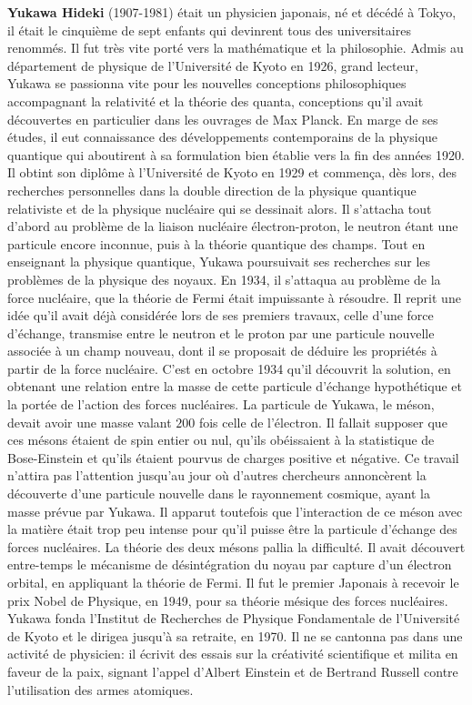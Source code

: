 \textbf{Yukawa Hideki} (1907-1981) était un physicien japonais, né et décédé à Tokyo, il était le cinquième de sept enfants qui devinrent tous des universitaires renommés. Il fut très vite porté vers la mathématique et la philosophie. Admis au département de physique de l'Université de Kyoto en 1926, grand lecteur, Yukawa se passionna vite pour les nouvelles conceptions philosophiques accompagnant la relativité et la théorie des quanta, conceptions qu'il avait découvertes en particulier dans les ouvrages de Max Planck. En marge de ses études, il eut connaissance des développements contemporains de la physique quantique qui aboutirent à sa formulation bien établie vers la fin des années 1920. Il obtint son diplôme à l'Université de Kyoto en 1929 et commença, dès lors, des recherches personnelles dans la double direction de la physique quantique relativiste et de la physique nucléaire qui se dessinait alors. Il s'attacha tout d'abord au problème de la liaison nucléaire électron-proton, le neutron étant une particule encore inconnue, puis à la théorie quantique des champs. Tout en enseignant la physique quantique, Yukawa poursuivait ses recherches sur les problèmes de la physique des noyaux. En 1934, il s'attaqua au problème de la force nucléaire, que la théorie de Fermi était impuissante à résoudre. Il reprit une idée qu'il avait déjà considérée lors de ses premiers travaux, celle d'une force d'échange, transmise entre le neutron et le proton par une particule nouvelle associée à un champ nouveau, dont il se proposait de déduire les propriétés à partir de la force nucléaire. C'est en octobre 1934 qu'il découvrit la solution, en obtenant une relation entre la masse de cette particule d'échange hypothétique et la portée de l'action des forces nucléaires. La particule de Yukawa, le méson, devait avoir une masse valant $200$ fois celle de l'électron. Il fallait supposer que ces mésons étaient de spin entier ou nul, qu'ils obéissaient à la statistique de Bose-Einstein et qu'ils étaient pourvus de charges positive et négative. Ce travail n'attira pas l'attention jusqu'au jour où d'autres chercheurs annoncèrent la découverte d'une particule nouvelle dans le rayonnement cosmique, ayant la masse prévue par Yukawa. Il apparut toutefois que l'interaction de ce méson avec la matière était trop peu intense pour qu'il puisse être la particule d'échange des forces nucléaires. La théorie des deux mésons pallia la difficulté. Il avait découvert entre-temps le mécanisme de désintégration du noyau par capture d'un électron orbital, en appliquant la théorie de Fermi. Il fut le premier Japonais à recevoir le prix Nobel de Physique, en 1949, pour sa théorie mésique des forces nucléaires. Yukawa fonda l'Institut de Recherches de Physique Fondamentale de l'Université de Kyoto et le dirigea jusqu'à sa retraite, en 1970. Il ne se cantonna pas dans une activité de physicien: il écrivit des essais sur la créativité scientifique et milita en faveur de la paix, signant l'appel d'Albert Einstein et de Bertrand Russell contre l'utilisation des armes atomiques.

